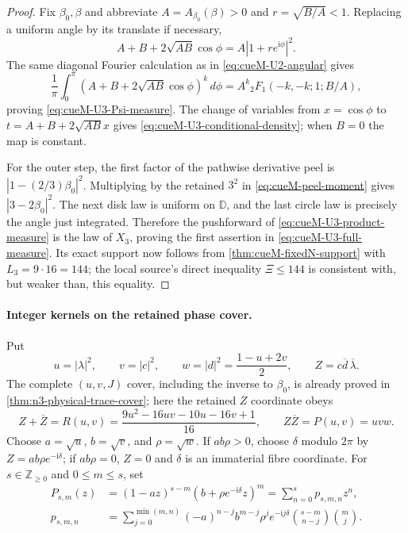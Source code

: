 \begin{proof}
Fix $\beta_0,\beta$ and abbreviate $A=A_{\beta_0}(\beta)>0$ and
$r=\sqrt{B/A}<1$.  Replacing a uniform angle by its translate if necessary,
\[
 A+B+2\sqrt{AB}\cos\phi=A|1+re^{\mathrm i\phi}|^2.
\]
The same diagonal Fourier calculation as in
\eqref{eq:cueM-U2-angular} gives
\[
 \frac1\pi\int_0^\pi
 (A+B+2\sqrt{AB}\cos\phi)^k\,d\phi
 =A^k{}_2F_1(-k,-k;1;B/A),
\]
proving \eqref{eq:cueM-U3-Psi-measure}.  The change of variables from
$x=\cos\phi$ to $t=A+B+2\sqrt{AB}x$ gives
\eqref{eq:cueM-U3-conditional-density}; when $B=0$ the map is constant.

For the outer step, the first factor of the pathwise derivative peel is
$|1-(2/3)\beta_0|^2$.  Multiplying by the retained $3^2$ in
\eqref{eq:cueM-peel-moment} gives $|3-2\beta_0|^2$.  The next disk law is uniform on
$\mathbb D$, and the last circle law is precisely the angle just integrated.  Therefore the
pushforward of \eqref{eq:cueM-U3-product-measure} is the law of $X_3$, proving the first
assertion in \eqref{eq:cueM-U3-full-measure}.  Its exact support now follows from
\cref{thm:cueM-fixedN-support} with $L_3=9\cdot16=144$; the local source's direct inequality
$\Xi\leq144$ is consistent with, but weaker than, this equality.
\end{proof}

\paragraph{Integer kernels on the retained phase cover.}
Put
\begin{equation}
 u=|\lambda|^2,\qquad v=|c|^2,\qquad
 w=|d|^2=\frac{1-u+2v}{2},\qquad
 Z=c\overline d\,\overline\lambda.
 \label{eq:cueM-U3-u-v-w-Z}
\end{equation}
The complete $(u,v,J)$ cover, including the inverse to $\beta_0$, is already proved in
\cref{thm:n3-physical-trace-cover}; here the retained $Z$ coordinate obeys
\begin{equation}
 Z+\overline Z=R(u,v)=\frac{9u^2-16uv-10u-16v+1}{16},\qquad
 Z\overline Z=P(u,v)=uvw.
 \label{eq:cueM-U3-trace-norm}
\end{equation}
Choose $a=\sqrt u$, $b=\sqrt v$, and $\rho=\sqrt w$.  If $ab\rho>0$, choose
$\delta$ modulo $2\pi$ by $Z=ab\rho e^{-\mathrm i\delta}$; if $ab\rho=0$, $Z=0$ and
$\delta$ is an immaterial fibre coordinate.  For $s\in\mathbb Z_{\geq0}$ and
$0\leq m\leq s$, set
\begin{align}
 P_{s,m}(z)&=(1-az)^{s-m}(b+\rho e^{-\mathrm i\delta}z)^m
 =\sum_{n=0}^{s}p_{s,m,n}z^n,
 \label{eq:cueM-U3-Psm}\\
 p_{s,m,n}&=\sum_{j=0}^{\min(m,n)}
 (-a)^{n-j}b^{m-j}\rho^je^{-\mathrm i j\delta}
 \binom{s-m}{n-j}\binom mj.
 \label{eq:cueM-U3-psmn}
\end{align}

